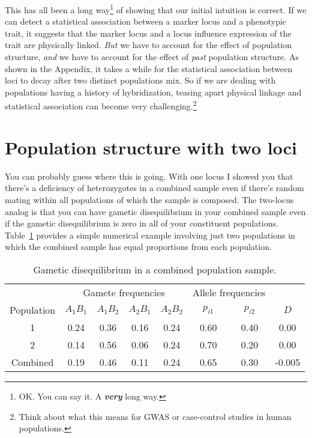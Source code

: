 \documentclass[12pt]{article}
\begin{document}
This has all been a long way\footnote{OK. You can say it. A {\bf\it
    very\/} long way.} of showing that our initial intuition is
correct. If we can detect a statistical association between a marker
locus and a phenotypic trait, it suggests that the marker locus and a
locus influence expression of the trait are physically linked. {\it
  But\/} we have to account for the effect of population structure,
{\it and\/} we have to account for the effect of {\it past\/}
population structure. As shown in the Appendix, it takes a while for
the statistical association between loci to decay after two distinct
populations mix. So if we are dealing with populations having a
history of hybridization, teasing apart physical linkage and
statistical association can become very challenging.\footnote{Think
  about what this means for GWAS or case-control studies in human
  populations.}

\section*{Population structure with two loci}

You can probably guess where this is going. With one locus I showed
you that there's a deficiency of heterozygotes in a combined sample
even if there's random mating within all populations of which the
sample is composed. The two-locus analog is that you can have gametic
disequilibrium in your combined sample even if the gametic
disequilibrium is zero in all of your constituent
populations. Table~\ref{table:d-structure} provides a simple numerical
example involving just two populations in which the combined sample
has equal proportions from each population.

\begin{table}
\begin{center}
\begin{tabular}{c|cccc|cc|c}
\hline\hline
           & \multicolumn{4}{c|}{Gamete frequencies}
           & \multicolumn{2}{c|}{Allele frequencies} \\
Population & $A_1B_1$ & $A_1B_2$ & $A_2B_1$ & $A_2B_2$
           & $p_{i1}$ & $p_{i2}$ & $D$ \\
\hline
1          & 0.24     & 0.36     & 0.16    & 0.24
           & 0.60     & 0.40     & 0.00 \\
2          & 0.14     & 0.56     & 0.06    & 0.24
           & 0.70     & 0.20     & 0.00 \\
Combined   & 0.19     & 0.46     & 0.11    & 0.24
           & 0.65     & 0.30     & -0.005 \\
\hline
\end{tabular}
\end{center}
\caption{Gametic disequilibrium in a combined population
  sample.}\label{table:d-structure}
\end{table}
\end{document}
